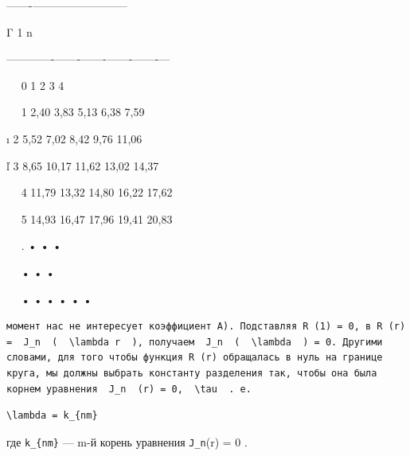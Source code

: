\documentclass[
  ukrainian,
]{article}
\begin{document}
\textbar-------\textbar------------\textbar--------------\textbar{}

Γ \textbar{} 1 \textbar{} n \textbar{} \textbar{} \textbar{} \textbar{}
\textbar{} \textbar{} \textbar{}

\textbar---\textbar---\textbar-------\textbar-------\textbar-------\textbar-------\textbar-------\textbar--\textbar--\textbar{}

~~\textbar{} \textbar{} 0 \textbar{} 1 \textbar{} 2 \textbar{} 3
\textbar{} 4 \textbar{} \textbar{} \textbar{}

~~\textbar{} 1 \textbar{} 2,40 \textbar{} 3,83 \textbar{} 5,13
\textbar{} 6,38 \textbar{} 7,59 \textbar{} \textbar{} \textbar{}

ı \textbar{} 2 \textbar{} 5,52 \textbar{} 7,02 \textbar{} 8,42
\textbar{} 9,76 \textbar{} 11,06 \textbar{} \textbar{} \textbar{}

ľ \textbar{} 3 \textbar{} 8,65 \textbar{} 10,17 \textbar{} 11,62
\textbar{} 13,02 \textbar{} 14,37 \textbar{} \textbar{} \textbar{}

~~\textbar{} 4 \textbar{} 11,79 \textbar{} 13,32 \textbar{} 14,80
\textbar{} 16,22 \textbar{} 17,62 \textbar{} \textbar{} \textbar{}

~~\textbar{} 5 \textbar{} 14,93 \textbar{} 16,47 \textbar{} 17,96
\textbar{} 19,41 \textbar{} 20,83 \textbar{} \textbar{} \textbar{}

~~\textbar{} . \textbar{} • \textbar{} \textbar{} • \textbar{}
\textbar{} • \textbar{} \textbar{} \textbar{}

~~\textbar{} \textbar{} \textbar{} • \textbar{} \textbar{} • \textbar{}
• \textbar{} \textbar{} \textbar{}

~~\textbar{} • \textbar{} • \textbar{} • \textbar{} • \textbar{} •
\textbar{} • \textbar{} \textbar{} \textbar{}

\begin{verbatim}
момент нас не интересует коэффициент A). Подставляя R (1) = 0, в R (r) =  J_n  (  \lambda r  ), получаем  J_n  (  \lambda  ) = 0. Другими словами, для того чтобы функция R (r) обращалась в нуль на границе круга, мы должны выбрать константу разделения так, чтобы она была корнем уравнения  J_n  (r) = 0,  \tau  . e.
\end{verbatim}

\begin{verbatim}
\lambda = k_{nm}
\end{verbatim}

где \texttt{k\_\{nm\}} --- m-й корень уравнения \texttt{J\_n}(r) = 0 .
\end{document}

